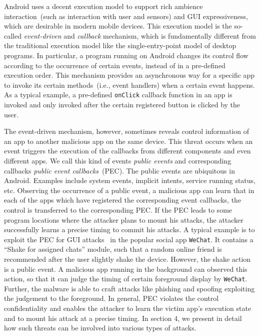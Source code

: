 Android uses a decent execution model to support rich ambience interaction~(such as interaction with user and sensors) and GUI expressiveness, 
which are desirable in modern mobile devices. 
This execution model is the so-called \emph{event-driven} and \emph{callback} mechanism, 
which is fundamentally different from the traditional execution model like the single-entry-point model of desktop programs. 
In particular, a program running on Android changes its control flow according to the occurrence of certain events, instead of in a pre-defined execution order. 
This mechanism provides an asynchronous way for a specific app to invoke its certain methods~(i.e., event handlers) when a certain event happens. 
As a typical example, a pre-defined \texttt{onClick} callback function in an app is invoked and only invoked after the certain registered button is clicked by the user. 

The event-driven mechanism, however, sometimes reveals control information of an app to another malicious app on the same device. 
This threat occurs when an event triggers the execution of the callbacks from different components and even different apps. 
We call this kind of events \emph{public events}  
and corresponding callbacks \emph{public event callbacks}~(PEC). 
The public events are ubiquitous in Android. Examples 
include system events, implicit intents, service running status, etc. 
Observing the occurrence of a public event, 
a malicious app can learn that in each of the apps which have registered the corresponding event callbacks, 
the control is transferred to the corresponding PEC. 
If the PEC leads to some program locations where the attacker plans to mount his attacks, 
the attacker successfully learns a precise timing to commit his attacks. 
A typical example is to exploit the PEC for GUI attacks~\cite{chen2014peeking,bianchi2015app,ren2015towards} in the popular social app \texttt{WeChat}. 
It contains a ``Shake for assigned chats'' module, such that 
a random online friend is recommended after the user slightly shake the device. 
However, the shake action is a public event. 
A malicious app running in the background can observed this action, so that it can judge the timing of certain foreground display by \texttt{WeChat}. 
Further, the malware is able to craft attacks like phishing and spoofing exploiting the judgement to the foreground. 
In general, PEC violates the control confidentiality 
and enables the attacker to learn the victim app's execution state and to mount his attack at a precise timing. 
In section 4, we present in detail how such threats can be involved into various types of attacks. 


